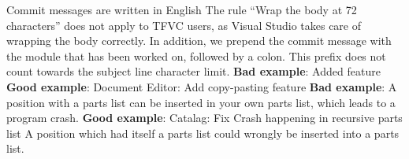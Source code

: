 \documentclass[11pt,a4paper]{article}
\begin{document}
Commit messages are written in English
\newline
The rule \enquote{Wrap the body at 72 characters} does not apply to TFVC users, as Visual Studio takes care of wrapping the body correctly.
In addition, we prepend the commit message with the module that has been worked on, followed by a colon. This prefix does not count towards the subject line character limit.
\newline
\textbf{Bad example}: Added feature
\newline
\textbf{Good example}: Document Editor: Add copy-pasting feature
\newline
\textbf{Bad example}:  A position with a parts list can be inserted in your own parts list, which leads to a program crash.
\newline
\textbf{Good example}: Catalag: Fix Crash happening in recursive parts list
A position which had itself a parts list could wrongly be inserted into a parts list.
\end{document}
